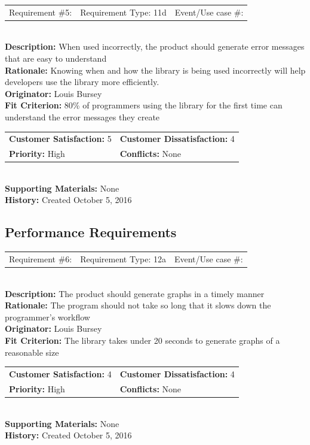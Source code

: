\documentclass[12pt, titlepage]{article}
\begin{document}
%
%
\begin{reqbox}
\begin{tabular}{ccc}
Requirement \#5: & Requirement Type: 11d & Event/Use case \#: \\
\end{tabular} \\
\textbf{Description:} When used incorrectly, the product should generate error messages that are easy to understand \\
\textbf{Rationale:} Knowing when and how the library is being used incorrectly will help developers use the library more efficiently. \\
\textbf{Originator:} Louis Bursey\\
\textbf{Fit Criterion:}  80\% of programmers using the library for the first time can understand the error messages they create \\
\begin{tabular}{ll}
\textbf{Customer Satisfaction:} 5 & \textbf{Customer Dissatisfaction:} 4 \\
\textbf{Priority:} High & \textbf{Conflicts:} None\\
\end{tabular} \\
\textbf{Supporting Materials:} None \\
\textbf{History:} Created October 5, 2016
\end{reqbox}
%
%

\subsection{Performance Requirements}
%
%
\begin{reqbox}
\begin{tabular}{ccc}
Requirement \#6: & Requirement Type: 12a & Event/Use case \#: \\
\end{tabular} \\
\textbf{Description:} The product should generate graphs in a timely manner \\
\textbf{Rationale:} The program should not take so long that it slows down the programmer's workflow \\
\textbf{Originator:} Louis Bursey\\
\textbf{Fit Criterion:}  The library takes under 20 seconds to generate graphs of a reasonable size \\
\begin{tabular}{ll}
\textbf{Customer Satisfaction:} 4 & \textbf{Customer Dissatisfaction:} 4 \\
\textbf{Priority:} High & \textbf{Conflicts:} None\\
\end{tabular} \\
\textbf{Supporting Materials:} None \\
\textbf{History:} Created October 5, 2016
\end{reqbox}
%
%
\end{document}
